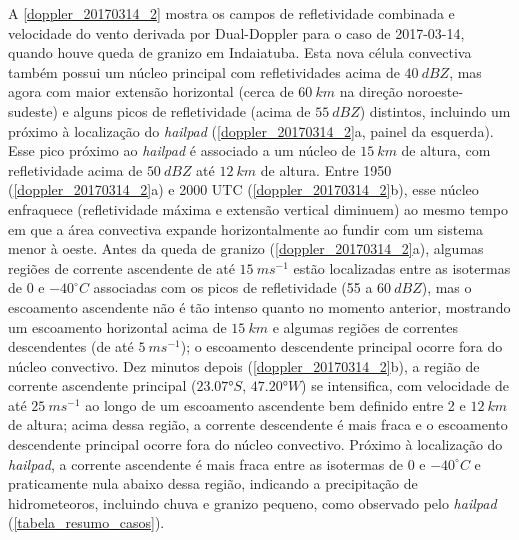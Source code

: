A \autoref{doppler_20170314_2} mostra os campos de refletividade combinada e velocidade do vento derivada por Dual-Doppler para o caso de 2017-03-14, quando houve queda de granizo em Indaiatuba. Esta nova célula convectiva também possui um núcleo principal com refletividades acima de $40\:dBZ$, mas agora com maior extensão horizontal (cerca de $60\:km$ na direção noroeste-sudeste) e alguns picos de refletividade (acima de $55\:dBZ$) distintos, incluindo um próximo à localização do \textit{hailpad} (\autoref{doppler_20170314_2}a, painel da esquerda). Esse pico próximo ao \textit{hailpad} é associado a um núcleo de $15\:km$ de altura, com refletividade acima de $50\:dBZ$ até $12\:km$ de altura. Entre 1950 (\autoref{doppler_20170314_2}a) e 2000 UTC (\autoref{doppler_20170314_2}b), esse núcleo enfraquece (refletividade máxima e extensão vertical diminuem) ao mesmo tempo em que a área convectiva expande horizontalmente ao fundir com um sistema menor à oeste. Antes da queda de granizo (\autoref{doppler_20170314_2}a), algumas regiões de corrente ascendente de até $15\:ms^{-1}$ estão localizadas entre as isotermas de 0 e $-40^{\circ}C$ associadas com os picos de refletividade (55 a $60\:dBZ$), mas o escoamento ascendente não é tão intenso quanto no momento anterior, mostrando um escoamento horizontal acima de $15\:km$ e algumas regiões de correntes descendentes (de até $5\:ms^{-1}$); o escoamento descendente principal ocorre fora do núcleo convectivo. Dez minutos depois (\autoref{doppler_20170314_2}b), a região de corrente ascendente principal ($\ang{23.07}S$, $\ang{47.20}W$) se intensifica, com velocidade de até $25\:ms^{-1}$ ao longo de um escoamento ascendente bem definido entre 2 e $12\:km$ de altura; acima dessa região, a corrente descendente é mais fraca e o escoamento descendente principal ocorre fora do núcleo convectivo. Próximo à localização do \textit{hailpad}, a corrente ascendente é mais fraca entre as isotermas de 0 e $-40^{\circ}C$ e praticamente nula abaixo dessa região, indicando a precipitação de hidrometeoros, incluindo chuva e granizo pequeno, como observado pelo \textit{hailpad} (\autoref{tabela_resumo_casos}).

